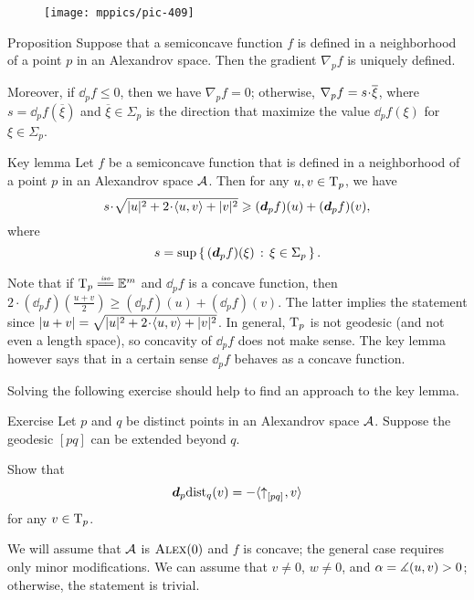\begin{figure}[ht!]
\centering
\texttt{[image: mppics/pic-409]}
\end{figure}

\begin{thm}{Proposition}\label{prop:grad-exist}
Suppose that a semiconcave function $f$ is defined in a neighborhood of a point $p$ in an Alexandrov space.
Then the gradient $\nabla_pf$ is uniquely defined.

Moreover, if $\dd_pf\le 0$, then we have $\nabla_pf=0$;
otherwise, $\nabla_pf\z=s\cdot \overline{\xi}$, where 
$s= \dd_pf(\overline{\xi})$
and
$\overline{\xi}\in \Sigma_p$ is the direction that maximize the value $\dd_pf(\xi)$ for $\xi\in \Sigma_p$.
\end{thm}


\begin{thm}{Key lemma}\label{lem:ohta} 
Let $f$ be a semiconcave function that is defined in a neighborhood of a point $p$
in an Alexandrov space $\mathcal{A}$. 
Then for any $u,v\in \mathrm{T}_p$, we have
\[s\cdot \sqrt{|u|^2+2\cdot\<u,v\> +|v|^2}
\ge 
(\dd_p f)(u)+(\dd_p f)(v),\]
where
\[s=\sup\left\{\,{(\bm{d}_p f)(\xi)}\,:\,{\xi\in\Sigma_p}\,\right\}.\]

\end{thm}

Note that if $\T_p\iso\EE^m$ and $\dd_p f$ is a concave function,
then $2\cdot(\dd_p f)(\tfrac{u+v}2)\ge(\dd_p f)(u)+(\dd_p f)(v)$.
The latter implies the statement since $|u+v|=\sqrt{|u|^2+2\cdot\<u,v\> +|v|^2}$.
In general, $\mathrm{T}_p$ is not geodesic (and not even a length space), so concavity of $\dd_p f$ does not make  sense.
The key lemma however says  that in a certain sense $\dd_p f$ behaves as a concave function.

Solving the following exercise should help to find an approach to the key lemma.

\begin{thm}{Exercise}\label{ex:d(distfun):==}
Let $p$ and $q$ be distinct points in an Alexandrov space $\mathcal{A}$.
Suppose the geodesic $[pq]$ can be extended beyond $q$.

Show that
\[\bm{d}_p\mathrm{dist}_q(v)= -\langle{\uparrow}_{[{p}{q}]_{{}}},v\rangle\]
for any $v\in\mathrm{T}_p$.
\end{thm}

We will assume that $\mathcal{A}$ is $\textsc{Alex}(0)$ and $f$ is concave;
the general case requires only minor modifications.
We can assume that $v\ne 0$, $w\ne 0$, and $\alpha=\measuredangle(u,v)>0$; otherwise, the statement is trivial.

